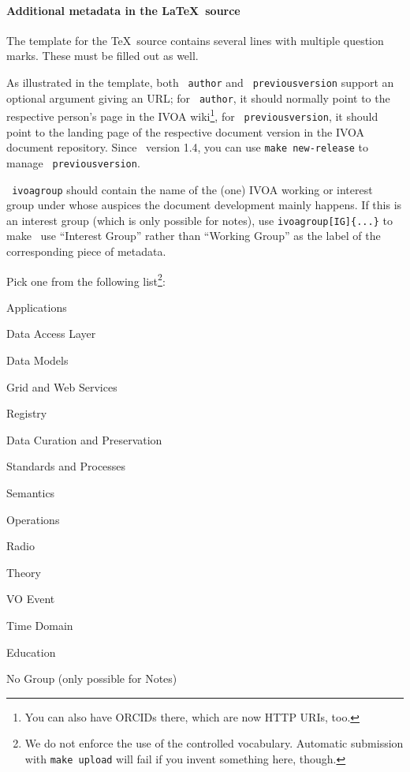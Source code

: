 \documentclass[11pt,a4paper]{ivoa}
\newcommand{\texword}[1]{\texttt{\color{texcolor} #1}}
\begin{document}
\paragraph{Additional metadata in the \LaTeX~source}

The template for the \TeX\ source contains several lines with
multiple question marks.  These must be filled out as well.

As illustrated in the template, both \texword{author} and
\texword{previousversion} support an optional argument giving an URL; for
\texword{author}, it should normally point to the respective person's
page in the IVOA wiki\footnote{You can also have ORCIDs there, which are
now HTTP URIs, too.}, for \texword{previousversion}, it should point to
the landing page of the respective document version in the IVOA document
repository.  Since \ivoatex~version 1.4, you can use
\verb|make new-release| to manage \texword{previousversion}.

\texword{ivoagroup} should contain the name of the (one) IVOA working or
interest group under whose auspices the document development mainly
happens.  If this is an interest group (which is only possible for
notes), use \verb|ivoagroup[IG]{...}| to make \ivoatex~use ``Interest
Group'' rather than ``Working Group'' as the label of the corresponding
piece of metadata.

Pick one from the following list\footnote{We do not
enforce the use of the controlled vocabulary.  Automatic submission
with \texttt{make upload} will fail if you invent something here,
though.}:

\begin{compactitem}
\item Applications
\item Data Access Layer
\item Data Models
\item Grid and Web Services
\item Registry
\item Data Curation and Preservation
\item Standards and Processes
\item Semantics
\item Operations
\item Radio
\item Theory
\item VO Event
\item Time Domain
\item Education
\item No Group (only possible for Notes)
\end{compactitem}
\end{document}
